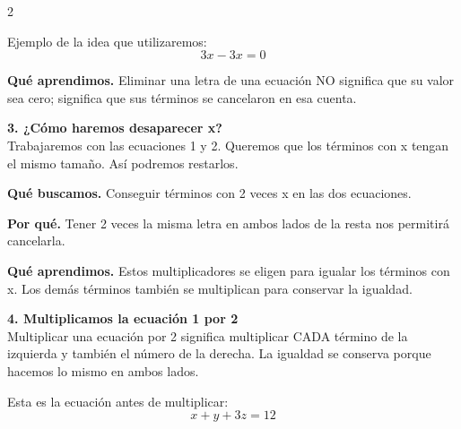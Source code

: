 \documentclass[11pt,a4paper,landscape]{article}
\begin{document}
\begin{multicols*}{2}
\begin{minipage}{\linewidth}
\par\smallskip Ejemplo de la idea que utilizaremos:
\[3x-3x=0\]
\par\smallskip\textbf{Qué aprendimos.} Eliminar una letra de una ecuación NO significa que su valor sea cero; significa que sus términos se cancelaron en esa cuenta.
\end{minipage}\par\medskip
\noindent\begin{minipage}{\linewidth}\textbf{3. ¿Cómo haremos desaparecer x?}\\[2pt]Trabajaremos con las ecuaciones 1 y 2. Queremos que los términos con x tengan el mismo tamaño. Así podremos restarlos.
\par\smallskip\textbf{Qué buscamos.} Conseguir términos con 2 veces x en las dos ecuaciones.
\par\smallskip\textbf{Por qué.} Tener 2 veces la misma letra en ambos lados de la resta nos permitirá cancelarla.
\par{}\par\smallskip
\par\smallskip\textbf{Qué aprendimos.} Estos multiplicadores se eligen para igualar los términos con x. Los demás términos también se multiplican para conservar la igualdad.
\end{minipage}\par\medskip
\noindent\begin{minipage}{\linewidth}\textbf{4. Multiplicamos la ecuación 1 por 2}\\[2pt]Multiplicar una ecuación por 2 significa multiplicar CADA término de la izquierda y también el número de la derecha. La igualdad se conserva porque hacemos lo mismo en ambos lados.
\par\smallskip Esta es la ecuación antes de multiplicar:
\[x + y + 3z = 12\]

\end{minipage}
\end{multicols*}
\end{document}
